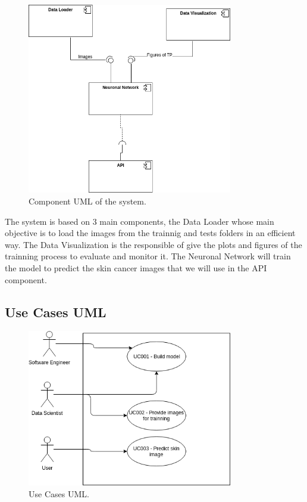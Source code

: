 \begin{figure}[H]
\centering
\includegraphics[width=0.8\textwidth]{./figures/component-uml}
\caption{Component UML of the system.}
\end{figure}

The system is based on 3 main components, the Data Loader whose main objective is to load the images from the trainnig and tests folders in an efficient way. The Data Visualization is the responsible of give the plots and figures of the trainning process to evaluate and monitor it. The Neuronal Network will train the model to predict the skin cancer images that we will use in the API component. 


\subsection{Use Cases UML}


\begin{figure}[H]
\centering
\includegraphics[width=0.8\textwidth]{./figures/use-case-uml}
\caption{Use Cases UML.}
\end{figure}

